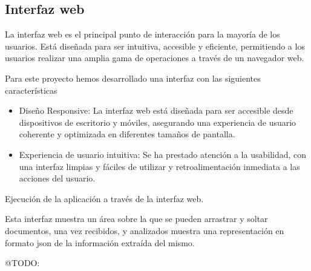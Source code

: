 \subsection*{Interfaz web}
La interfaz web es el principal punto de interacción para la mayoría de los usuarios. Está diseñada para ser intuitiva,
accesible y eficiente, permitiendo a los usuarios realizar una amplia gama de operaciones a través de un navegador web.

Para este proyecto hemos desarrollado una interfaz con las siguientes características

\begin{itemize}
    \item
    Diseño Responsive: La interfaz web está diseñada para ser accesible desde dispositivos de escritorio y móviles,
    asegurando una experiencia de usuario coherente y optimizada en diferentes tamaños de pantalla.
    \item
    Experiencia de usuario intuitiva: Se ha prestado atención a la usabilidad, con una interfaz limpias y fáciles de
    utilizar y retroalimentación inmediata a las acciones del usuario.
\end{itemize}


Ejecución de la aplicación a través de la interfaz web.

Esta interfaz muestra un área sobre la que se pueden arrastrar y soltar documentos, una vez recibidos, y analizados
muestra una representación en formato json de la información extraída del mismo.

\colorbox{color_highlight} {@TODO: }
